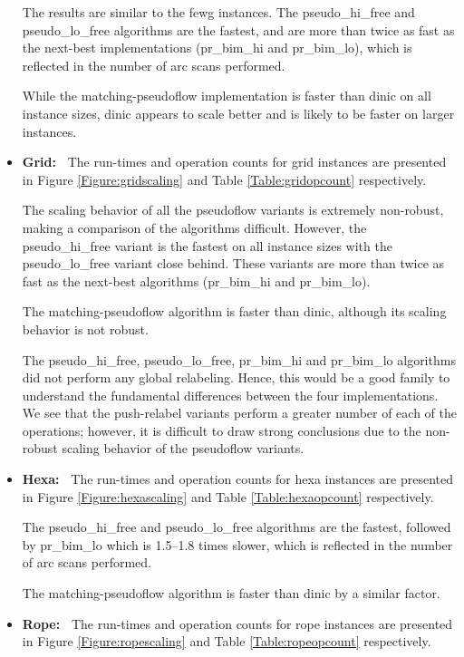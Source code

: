\documentclass{article}
\begin{document}
\begin{itemize}
The results are similar to the {\sf fewg} instances.  The {\sf pseudo\_hi\_free} and {\sf pseudo\_lo\_free} algorithms are the fastest, and are more than twice as fast as the next-best implementations ({\sf pr\_bim\_hi} and {\sf pr\_bim\_lo}), which is reflected in the number of arc scans performed.

While the {\sf matching-pseudoflow} implementation is faster than {\sf dinic} on all instance sizes, {\sf dinic} appears to scale better and is likely to be faster on larger instances.

\item {\bf Grid:~}  The run-times and operation counts for {\sf grid} instances are presented in Figure \ref{Figure:gridscaling} and Table \ref{Table:gridopcount} respectively.

The scaling behavior of all the pseudoflow variants is extremely non-robust, making a comparison of the algorithms difficult.  However, the {\sf pseudo\_hi\_free} variant is the fastest on all instance sizes with the {\sf pseudo\_lo\_free} variant close behind.  These variants are more than twice as fast as the next-best algorithms ({\sf pr\_bim\_hi} and {\sf pr\_bim\_lo}).

The {\sf matching-pseudoflow} algorithm is faster than {\sf dinic}, although its scaling behavior is not robust.

The {\sf pseudo\_hi\_free}, {\sf pseudo\_lo\_free}, {\sf pr\_bim\_hi} and {\sf pr\_bim\_lo} algorithms did not perform any global relabeling.  Hence, this would be a good family to understand the fundamental differences between the four implementations.  We see that the push-relabel variants perform a greater number of each of the operations; however, it is difficult to draw strong conclusions due to the non-robust scaling behavior of the pseudoflow variants.

\item {\bf Hexa:~}  The run-times and operation counts for {\sf hexa} instances are presented in Figure \ref{Figure:hexascaling} and Table \ref{Table:hexaopcount} respectively.

The {\sf pseudo\_hi\_free} and {\sf pseudo\_lo\_free} algorithms are the fastest, followed by {\sf pr\_bim\_lo} which is 1.5--1.8 times slower, which is reflected in the number of arc scans performed.

The {\sf matching-pseudoflow} algorithm is faster than {\sf dinic} by a similar factor.

\item {\bf Rope:~}  The run-times and operation counts for {\sf rope} instances are presented in Figure \ref{Figure:ropescaling} and Table \ref{Table:ropeopcount} respectively.


\end{itemize}
\end{document}
